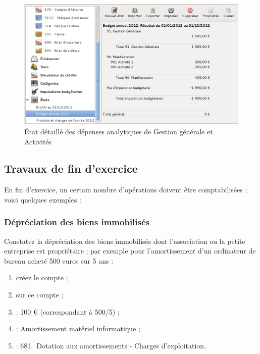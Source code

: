 \ifIllustration
\begin{figure}[!ht]
\begin{center}
\includegraphics[scale=0.5]{image/screenshot/asso_analyticExpenses}
\end{center}
\caption{État détaillé des dépenses analytiques de Gestion générale et Activités}
\label{asso-analyticExpenses-img}
\end{figure}
\fi	

\ifIllustration
\newpage
\fi


\subsection {Travaux de fin d’exercice} \label{association-plan-closingWork}

En fin d'exercice, un certain nombre d'opérations doivent être comptabilisées ; voici quelques exemples :


\subsubsection {Dépréciation des biens immobilisés} 

Constatez la dépréciation des biens immobilisés dont l’association ou la petite entreprise est propriétaire ; par exemple pour l'amortissement d'un ordinateur de bureau acheté 500 euros sur 5 ans :
\begin{enumerate}
	\item créez le compte  ;		
	\item sur ce compte ;
	\item {} : 100 € (correspondant à 500/5) ;
	\item {} : Amortissement matériel informatique ;
	\item {} : 681.~Dotation aux amortissements - Charges d'exploitation.
\end{enumerate}

